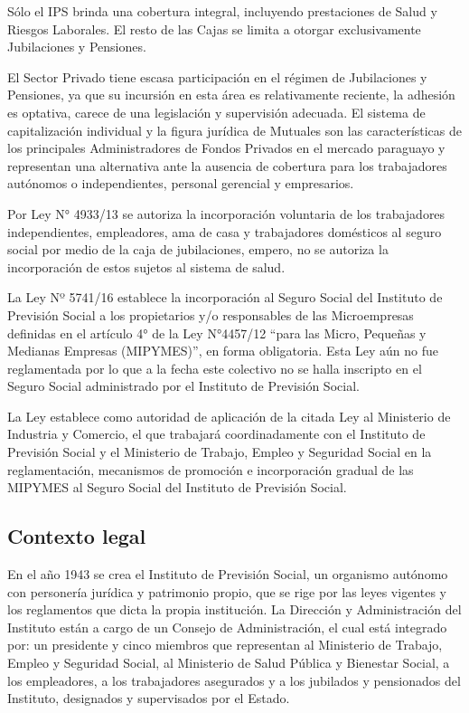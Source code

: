 Sólo el IPS brinda una cobertura integral, incluyendo prestaciones de Salud y Riesgos Laborales. El resto de las Cajas se limita a otorgar exclusivamente Jubilaciones y Pensiones. 

El Sector Privado tiene escasa participación en el régimen de Jubilaciones y Pensiones, ya que su incursión en esta área es relativamente reciente, la adhesión es optativa, carece de una legislación y supervisión adecuada. El sistema de capitalización individual y la figura jurídica de Mutuales son las características de los principales Administradores de Fondos Privados en el mercado paraguayo y representan una alternativa ante la ausencia de cobertura para los trabajadores autónomos o independientes, personal gerencial y empresarios. 

Por Ley N° 4933/13 se autoriza la incorporación voluntaria de los trabajadores independientes, empleadores, ama de casa y trabajadores domésticos al seguro social por medio de la caja de jubilaciones, empero, no se autoriza la incorporación de estos sujetos al sistema de salud.

La Ley Nº 5741/16 establece la incorporación al Seguro Social del Instituto de Previsión Social a los propietarios y/o responsables de las Microempresas definidas en el artículo 4° de la Ley N°4457/12 “para las Micro, Pequeñas y Medianas Empresas (MIPYMES)”, en forma obligatoria. Esta Ley aún no fue reglamentada por lo que a la fecha este colectivo no se halla inscripto en el Seguro Social administrado por el Instituto de Previsión Social.	

La Ley establece como autoridad de aplicación de la citada Ley al Ministerio de Industria y Comercio, el que trabajará coordinadamente con el Instituto de Previsión Social y el Ministerio de Trabajo, Empleo y Seguridad Social en la reglamentación, mecanismos de promoción e incorporación gradual de las MIPYMES al Seguro Social del Instituto de Previsión Social.

\subsection{Contexto legal}

En el año 1943 se crea el Instituto de Previsión Social,  un organismo autónomo con personería jurídica y patrimonio propio, que se rige por las leyes vigentes y los reglamentos que dicta la propia institución. La Dirección y Administración del Instituto están a cargo de un Consejo de Administración, el cual está integrado por: un presidente y cinco miembros que representan al Ministerio de Trabajo, Empleo y Seguridad Social, al Ministerio de Salud Pública y Bienestar Social, a los empleadores, a los trabajadores asegurados y a los jubilados y pensionados del Instituto, designados y supervisados por el Estado. 

